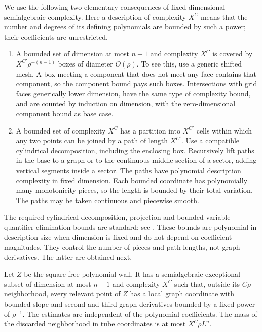 We use the following two elementary consequences of fixed-dimensional
semialgebraic complexity.  Here a description of complexity $X^C$
means that the number and degrees of its defining polynomials are
bounded by such a power; their coefficients are unrestricted.
\begin{enumerate}[label=\textup{(\alph*)}]
\item A bounded set of dimension at most $n-1$ and complexity $X^C$
is covered by $X^{C'}\rho^{-(n-1)}$ boxes of diameter $O(\rho)$.
To see this, use a generic shifted mesh.  A box meeting a component
that does not meet any face contains that component, so the component
bound pays such boxes.  Intersections with grid faces generically lower
dimension, have the same type of complexity bound, and are counted by
induction on dimension, with the zero-dimensional component bound as
base case.
\item A bounded set of complexity $X^C$ has a partition into $X^{C'}$
cells within which any two points can be joined by a path of length
$X^{C'}$.  Use a compatible cylindrical decomposition, including the
enclosing box.  Recursively lift paths in the base to a graph or to
the continuous middle section of a sector, adding vertical segments
inside a sector.  The paths have polynomial description complexity
in fixed dimension.  Each bounded coordinate has polynomially many
monotonicity pieces, so the length is bounded by their total variation.
The paths may be taken continuous and piecewise smooth.
\end{enumerate}
The required cylindrical decomposition, projection and bounded-variable
quantifier-elimination bounds are standard; see \citet{Basu2014}.
These bounds are polynomial in description size when dimension is
fixed and do not depend on coefficient magnitudes.  They control the
number of pieces and path lengths, not graph derivatives.  The latter
are obtained next.

\begin{lemma}\label{w:regular-wall}
Let $Z$ be the square-free polynomial wall.  It has a semialgebraic
exceptional subset of dimension at most $n-1$ and complexity $X^C$
such that, outside its $C\rho$-neighborhood, every relevant point of
$Z$ has a local graph coordinate with bounded slope and second and
third graph derivatives bounded by a fixed power of $\rho^{-1}$.
The estimates are independent of the polynomial coefficients.
The mass of the discarded neighborhood in tube coordinates is at most
$X^C\rho L^n$.
\end{lemma}

